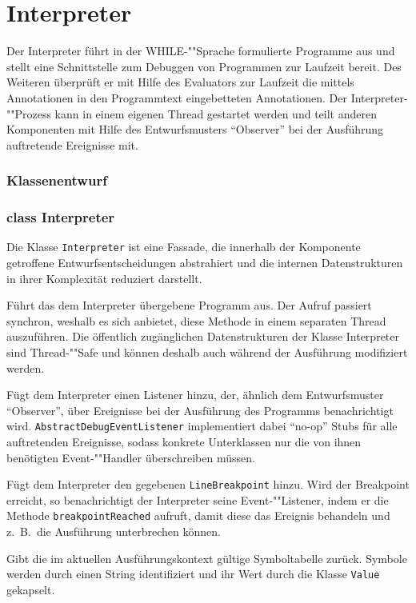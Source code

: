 \section{Interpreter}

Der Interpreter führt in der WHILE-""Sprache formulierte Programme aus und stellt eine Schnittstelle zum Debuggen von Programmen zur Laufzeit bereit. Des Weiteren überprüft er mit Hilfe des Evaluators zur Laufzeit die mittels Annotationen in den Programmtext eingebetteten Annotationen. Der Interpreter-""Prozess kann in einem eigenen Thread gestartet werden und teilt anderen Komponenten mit Hilfe des Entwurfsmusters ``Observer'' bei der Ausführung auftretende Ereignisse mit.

\subsubsection{Klassenentwurf}

\subsubsection{class Interpreter}
Die Klasse \texttt{Interpreter} ist eine Fassade, die innerhalb der Komponente getroffene Entwurfsentscheidungen abstrahiert und die internen Datenstrukturen in ihrer Komplexität reduziert darstellt.

\begin{description}

    Führt das dem Interpreter übergebene Programm aus. Der Aufruf passiert synchron, weshalb es sich anbietet, diese Methode in einem separaten Thread auszuführen. Die öffentlich zugänglichen Datenstrukturen der Klasse Interpreter sind Thread-""Safe und können deshalb auch während der Ausführung modifiziert werden.

    Fügt dem Interpreter einen Listener hinzu, der, ähnlich dem Entwurfsmuster ``Observer'', über Ereignisse bei der Ausführung des Programms benachrichtigt wird. \texttt{AbstractDebugEventListener} implementiert dabei ``no-op'' Stubs für alle auftretenden Ereignisse, sodass konkrete Unterklassen nur die von ihnen benötigten Event-""Handler überschreiben müssen.

    Fügt dem Interpreter den gegebenen \texttt{LineBreakpoint} hinzu. Wird der Breakpoint erreicht, so benachrichtigt der Interpreter seine Event-""Listener, indem er die Methode \texttt{breakpointReached} aufruft, damit diese das Ereignis behandeln und z.~B.\ die Ausführung unterbrechen können.

     Gibt die im aktuellen Ausführungskontext gültige Symboltabelle zurück. Symbole werden durch einen String identifiziert und ihr Wert durch die Klasse \texttt{Value} gekapselt.
\end{description}

